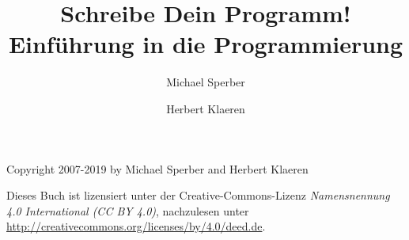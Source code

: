 \documentclass{tup}
\theoremstyle{plain}
\theoremstyle{plain}
\begin{document}
\setcounter{tocdepth}{1}
\begin{titlepage}
\title{Schreibe Dein Programm!\\{\large Einführung in die Programmierung}}
\author{Michael Sperber \and Herbert Klaeren}
\maketitle
Copyright \textcopyright{} 2007-2019 by Michael
  Sperber and Herbert Klaeren
  
  Dieses Buch ist lizensiert unter der Creative-Commons-Lizenz
  \textit{Namensnennung 4.0 International (CC BY 4.0)}, nachzulesen
  unter \url{http://creativecommons.org/licenses/by/4.0/deed.de}.
\end{titlepage}

\thispagestyle{empty}

\tableofcontents

\setcounter{page}{1}






































\appendix



\nocite{Klaeren1983,HailperinKaiserKnight1999,FelleisenFindlerFlattKrishnamurthi2001,AbelsonSussmanSussman1996,Barendregt1990,KelseyClingerRees1998,Goos1996,Thiemann1994-gfp,Brooks1995,Meyer1997,HuthRyan2004,Hofstadter1979,Raymond1996,FriedmanWandHaynes2001,BauerWoessner1984,Hinze1991}




\printindex
\end{document}
